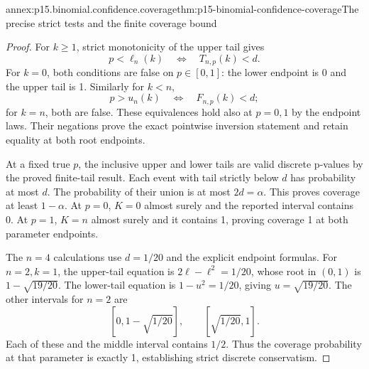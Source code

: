 \begin{annexitem}{annex:p15.binomial.confidence.coverage}{thm:p15-binomial-confidence-coverage}{The precise strict tests and the finite coverage bound}
\begin{proof}
For \(k\geq1\), strict
monotonicity of the upper
tail gives
\[
                   p<\ell_n(k)
                        \quad\Longleftrightarrow\quad
                   T_{n,p}(k)<d.
\]
For \(k=0\), both conditions
are false on \(p\in[0,1]\):
the lower endpoint is 0
and the upper tail is 1.
Similarly for \(k<n\),
\[
                   p>u_n(k)
                        \quad\Longleftrightarrow\quad
                   F_{n,p}(k)<d;
\]
for \(k=n\), both are
false. These equivalences
hold also at \(p=0,1\)
by the endpoint laws.
Their negations prove
the exact pointwise
inversion statement and
retain equality at both
root endpoints.

At a fixed true \(p\),
the inclusive upper and
lower tails are valid
discrete p-values by the
proved finite-tail result.
Each event with tail
strictly below \(d\)
has probability at most
\(d\). The probability
of their union is at
most \(2d=\alpha\).
This proves coverage at
least \(1-\alpha\).
At \(p=0\), \(K=0\)
almost surely and the
reported interval contains
0. At \(p=1\), \(K=n\)
almost surely and it
contains 1, proving
coverage 1 at both
parameter endpoints.

The \(n=4\) calculations
use \(d=1/20\) and the
explicit endpoint formulas.
For \(n=2,k=1\), the
upper-tail equation is
\(2\ell-\ell^2=1/20\),
whose root in \((0,1)\)
is \(1-\sqrt{19/20}\).
The lower-tail equation
is \(1-u^2=1/20\),
giving \(u=\sqrt{19/20}\).
The other intervals for
\(n=2\) are
\[
 [0,1-\sqrt{1/20}],\qquad
 [\sqrt{1/20},1].
\]
Each of these and the
middle interval contains
\(1/2\). Thus the
coverage probability at
that parameter is exactly
1, establishing strict
discrete conservatism.
\end{proof}
\end{annexitem}

